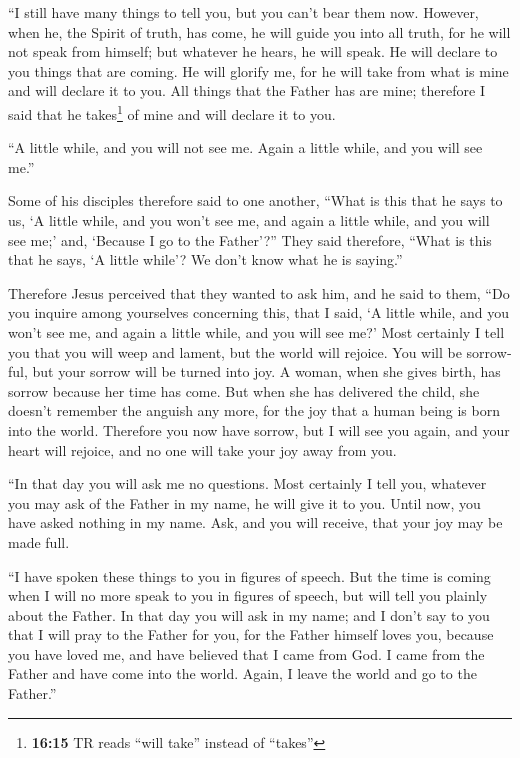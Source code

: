 \begin{paracol}{2}
\begin{otherlanguage}{english}
 ``I still have many things to tell you, but you can't
bear them now.  However, when he, the Spirit of truth,
has come, he will guide you into all truth, for he will not speak from
himself; but whatever he hears, he will speak. He will declare to you
things that are coming.  He will glorify me, for he will
take from what is mine and will declare it to you.  All
things that the Father has are mine; therefore I said that he
takes\footnote{\textbf{16:15} TR reads ``will take'' instead of
  ``takes''} of mine and will declare it to you.

 ``A little while, and you will not see me. Again a
little while, and you will see me.''

 Some of his disciples therefore said to one another,
``What is this that he says to us, `A little while, and you won't see
me, and again a little while, and you will see me;' and, `Because I go
to the Father'?''  They said therefore, ``What is this
that he says, `A little while'? We don't know what he is saying.''

 Therefore Jesus perceived that they wanted to ask him,
and he said to them, ``Do you inquire among yourselves concerning this,
that I said, `A little while, and you won't see me, and again a little
while, and you will see me?'  Most certainly I tell you
that you will weep and lament, but the world will rejoice. You will be
sorrowful, but your sorrow will be turned into joy.  A
woman, when she gives birth, has sorrow because her time has come. But
when she has delivered the child, she doesn't remember the anguish any
more, for the joy that a human being is born into the world.
 Therefore you now have sorrow, but I will see you again,
and your heart will rejoice, and no one will take your joy away from
you.

 ``In that day you will ask me no questions. Most
certainly I tell you, whatever you may ask of the Father in my name, he
will give it to you.  Until now, you have asked nothing
in my name. Ask, and you will receive, that your joy may be made full.

 ``I have spoken these things to you in figures of
speech. But the time is coming when I will no more speak to you in
figures of speech, but will tell you plainly about the Father.
 In that day you will ask in my name; and I don't say to
you that I will pray to the Father for you,  for the
Father himself loves you, because you have loved me, and have believed
that I came from God.  I came from the Father and have
come into the world. Again, I leave the world and go to the Father.''


\end{otherlanguage}
\end{paracol}
